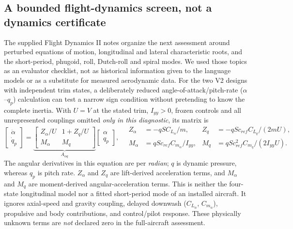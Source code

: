 \documentclass[10pt,letterpaper]{article}
\begin{document}
\subsection{A bounded flight-dynamics screen, not a dynamics certificate}
The supplied Flight Dynamics II notes organize the next assessment around perturbed equations of motion, longitudinal and lateral characteristic roots, and the short-period, phugoid, roll, Dutch-roll and spiral modes. We used those topics as an evaluator checklist, not as historical information given to the language models or as a substitute for measured aerodynamic data. For the two V2 designs with independent trim states, a deliberately reduced angle-of-attack/pitch-rate ($\alpha$--$q_p$) calculation can test a narrow sign condition without pretending to know the complete inertia. With $U=V$ at the stated trim, $I_{yy}>0$, frozen controls and all unrepresented couplings omitted \emph{only in this diagnostic}, its matrix is
\begin{equation}
\begin{bmatrix}\dot\alpha\\\dot q_p\end{bmatrix}
=\underbrace{\begin{bmatrix}Z_\alpha/U&1+Z_q/U\\M_\alpha&M_q\end{bmatrix}}_{A_{\alpha q}}
\begin{bmatrix}\alpha\\q_p\end{bmatrix},\quad
\begin{aligned}
Z_\alpha&=-qSC_{L_\alpha}/m,&Z_q&=-qSc_{ref}C_{L_q}/(2mU),\\
M_\alpha&=qSc_{ref}C_{m_\alpha}/I_{yy},&M_q&=qSc_{ref}^{2}C_{m_q}/(2I_{yy}U).
\end{aligned}
\label{eq:reduced_dynamic_screen}
\end{equation}
The angular derivatives in this equation are per \emph{radian}; $q$ is dynamic pressure, whereas $q_p$ is pitch rate. $Z_\alpha$ and $Z_q$ are lift-derived acceleration terms, and $M_\alpha$ and $M_q$ are moment-derived angular-acceleration terms. This is neither the four-state longitudinal model nor a fitted short-period mode of an installed aircraft. It ignores axial-speed and gravity coupling, delayed downwash ($C_{L_{\dot\alpha}}$, $C_{m_{\dot\alpha}}$), propulsive and body contributions, and control/pilot response. These physically unknown terms are \emph{not} declared zero in the full-aircraft assessment.
\end{document}
